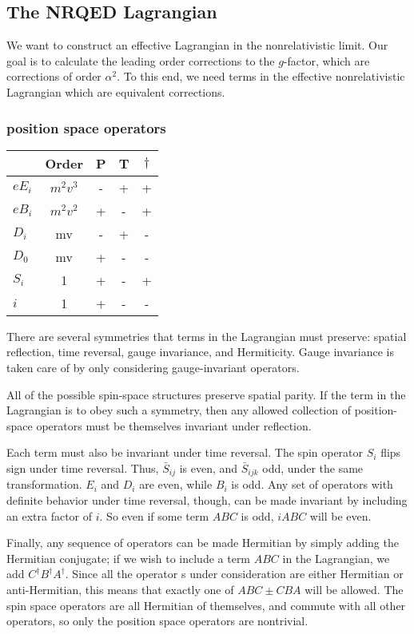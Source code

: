 \subsection{The NRQED Lagrangian}

We want to construct an effective Lagrangian in the nonrelativistic limit.  Our goal is to calculate the leading order corrections to the $g$-factor, which are corrections of order $\alpha^2$.  To this end, we need terms in the effective nonrelativistic Lagrangian which are equivalent corrections.
\subsubsection{position space operators}

\begin{tabular}{l|c|ccc}
& Order	&	P	&	T	&	$\dagger$	\\
\hline
$eE_i$	&$m^2v^3$	&	-	& 	+	&	+		\\
$eB_i$	&$m^2v^2$	&	+	&   -	&	+		\\
$D_i$		& mv	&	-	&	+	&	-		\\
$D_0$		& mv	&	+	&	-	&	-		\\
$S_i$		& 1		&	+	&	-	&	+		\\
$i$		& 1		&	+	&	-	&	-		\\
\end{tabular}


There are several symmetries that terms in the Lagrangian must preserve: spatial reflection, time reversal, gauge invariance, and Hermiticity.  Gauge invariance is taken care of by only considering gauge-invariant operators.

All of the possible spin-space structures preserve spatial parity.  If the term in the Lagrangian is to obey such a symmetry, then any allowed collection of position-space operators must be themselves invariant under reflection.  

Each term must also be invariant under time reversal.  The spin operator $S_i$ flips sign under time reversal.  Thus, $\bar{S}_{ij}$ is even, and $\bar{S}_{ijk}$ odd, under the same transformation.  $E_i$ and $D_i$ are even, while $B_i$ is odd.  Any set of operators with definite behavior under time reversal, though, can be made invariant by including an extra factor of $i$.  So even if some term $ABC$ is odd, $iABC$ will be even.

Finally, any sequence of operators can be made Hermitian by simply adding the Hermitian conjugate; if we wish to include a term $ABC$ in the Lagrangian, we add $C^\dagger B^\dagger A^\dagger$.  Since all the operator	s under consideration are either Hermitian or anti-Hermitian, this means that exactly one of $ABC \pm CBA$ will be allowed.  The spin space operators are all Hermitian of themselves, and commute with all other operators, so only the position space operators are nontrivial.


